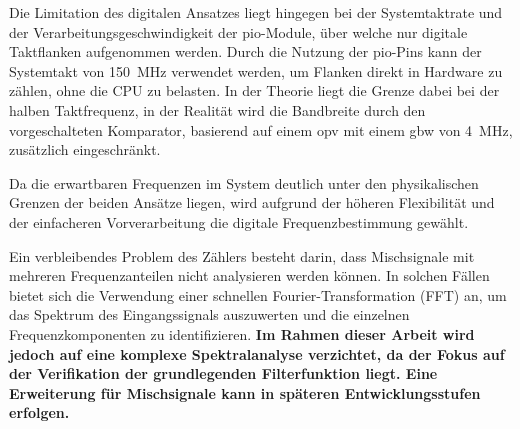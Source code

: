 \documentclass[../main.tex]{subfiles}
\begin{document}
Die Limitation des digitalen Ansatzes liegt hingegen bei der Systemtaktrate und der Verarbeitungsgeschwindigkeit der \gls{pio}-Module, über welche nur digitale Taktflanken aufgenommen werden. Durch die Nutzung der \gls{pio}-Pins kann der Systemtakt von \SI{150}{\mega\hertz} verwendet werden, um Flanken direkt in Hardware zu zählen, ohne die CPU zu belasten. In der Theorie liegt die Grenze dabei bei der halben Taktfrequenz, in der Realität wird die Bandbreite durch den vorgeschalteten Komparator, basierend auf einem \gls{opv} mit einem \gls{gbw} von \SI{4}{\mega\hertz}, zusätzlich eingeschränkt. \par
\medskip

Da die erwartbaren Frequenzen im System deutlich unter den physikalischen Grenzen der beiden Ansätze liegen, wird aufgrund der höheren Flexibilität und der einfacheren Vorverarbeitung die digitale Frequenzbestimmung gewählt. \par
\medskip

Ein verbleibendes Problem des Zählers besteht darin, dass Mischsignale mit mehreren Frequenzanteilen nicht analysieren werden können. In solchen Fällen bietet sich die Verwendung einer schnellen Fourier-Transformation (FFT) an, um das Spektrum des Eingangssignals auszuwerten und die einzelnen Frequenzkomponenten zu identifizieren. \textbf{Im Rahmen dieser Arbeit wird jedoch auf eine komplexe Spektralanalyse verzichtet, da der Fokus auf der Verifikation der grundlegenden Filterfunktion liegt. Eine Erweiterung für Mischsignale kann in späteren Entwicklungsstufen erfolgen. }
\end{document}
